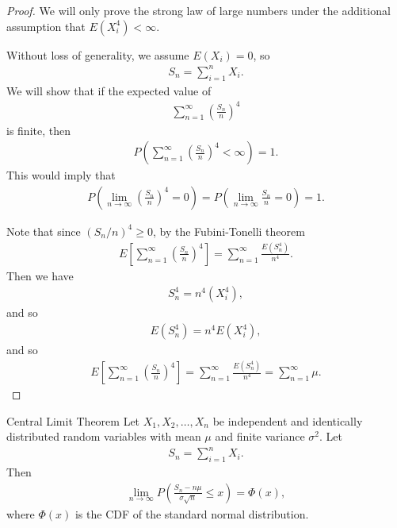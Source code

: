 \begin{proof}
    We will only prove the strong law of large numbers under the additional assumption that $E(X_i^4) < \infty$.

    Without loss of generality, we assume $E(X_i) = 0$, so
    \begin{align}
        S_n = \sum_{i=1}^{n}X_i.
    \end{align}
    We will show that if the expected value of
    \begin{align}
        \sum_{n=1}^{\infty}\left(\frac{S_n}{n}\right)^{4}
    \end{align}
    is finite, then
    \begin{align*}
        P\left(\sum_{n=1}^{\infty}\left(\frac{S_n}{n}\right)^{4} < \infty\right) = 1.
    \end{align*}
    This would imply that
    \begin{align*}
        P\left(\lim_{n\to\infty}\left(\frac{S_n}{n}\right)^{4} = 0\right) = P\left(\lim_{n\to\infty}\frac{S_n}{n} = 0\right) = 1.
    \end{align*}

    Note that since $\left(S_n/n\right)^4 \geq 0$, by the Fubini-Tonelli theorem
    \begin{align*}
        E\left[\sum_{n=1}^{\infty}\left(\frac{S_n}{n}\right)^4\right] = \sum_{n=1}^{\infty}\frac{E\left(S_n^4\right)}{n^4}.
    \end{align*}
    Then we have \begin{align*}
        S_n^4 = n^4\left(X_i^4\right),
    \end{align*}
    and so
    \begin{align}
        E(S_n^4) = n^4E(X_i^4),
    \end{align}
    and so
    \begin{align*}
        E\left[\sum_{n=1}^{\infty}\left(\frac{S_n}{n}\right)^4\right] = \sum_{n=1}^{\infty}\frac{E\left(S_n^4\right)}{n^4} = \sum_{n=1}^{\infty}\mu.
    \end{align*}
\end{proof}

\begin{thm}{Central Limit Theorem}\label{central-limit-theorem}\proofbreak
    Let $X_1, X_2, \ldots, X_n$ be independent and identically distributed random variables with mean $\mu$ and finite variance $\sigma^2$. Let
    \begin{align*}
        S_n = \sum_{i=1}^{n}X_i.
    \end{align*}
    Then
    \begin{align*}
        \lim_{n \to \infty}P\left(\frac{S_n - n\mu}{\sigma\sqrt{n}} \leq x\right) = \varPhi(x),
    \end{align*}
    where $\varPhi(x)$ is the CDF of the standard normal distribution.
\end{thm}

